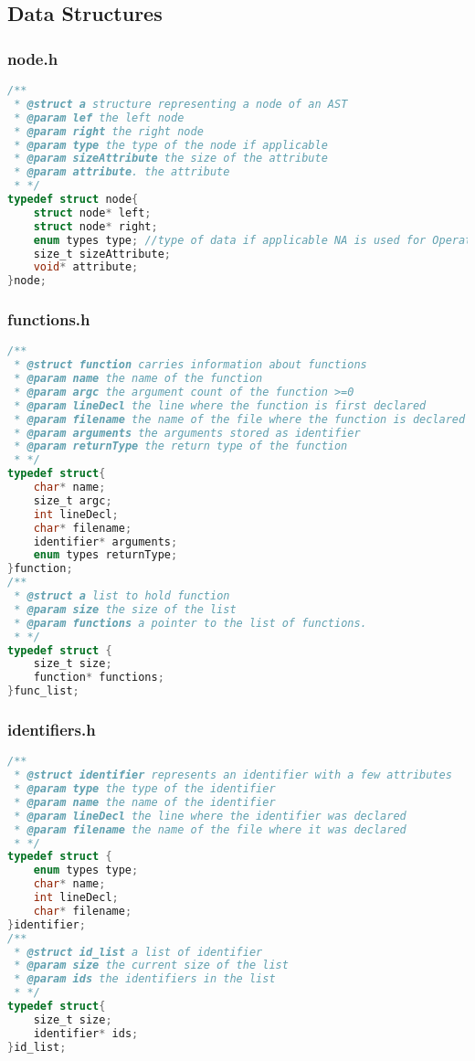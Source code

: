 \documentclass{article}
\begin{document}
\subsection{Data Structures}
\subsubsection{node.h}
\begin{lstlisting}[language=C]
/**
 * @struct a structure representing a node of an AST
 * @param lef the left node
 * @param right the right node
 * @param type the type of the node if applicable 
 * @param sizeAttribute the size of the attribute
 * @param attribute. the attribute
 * */
typedef struct node{
	struct node* left;
	struct node* right;
	enum types type; //type of data if applicable NA is used for Operators. 
	size_t sizeAttribute;
	void* attribute;
}node;


\end{lstlisting}
\subsubsection{functions.h}
\begin{lstlisting}[language=C]
/**
 * @struct function carries information about functions
 * @param name the name of the function
 * @param argc the argument count of the function >=0 
 * @param lineDecl the line where the function is first declared
 * @param filename the name of the file where the function is declared
 * @param arguments the arguments stored as identifier
 * @param returnType the return type of the function 
 * */
typedef struct{
	char* name;
	size_t argc;
	int lineDecl;
	char* filename;
	identifier* arguments;
	enum types returnType;
}function;
/**
 * @struct a list to hold function
 * @param size the size of the list
 * @param functions a pointer to the list of functions. 
 * */
typedef struct {
	size_t size;
	function* functions;
}func_list;


\end{lstlisting}

\subsubsection{identifiers.h}
\begin{lstlisting}[language=C]
/**
 * @struct identifier represents an identifier with a few attributes
 * @param type the type of the identifier
 * @param name the name of the identifier
 * @param lineDecl the line where the identifier was declared
 * @param filename the name of the file where it was declared
 * */
typedef struct {
	enum types type;
	char* name; 
	int lineDecl;
	char* filename;
}identifier;
/**
 * @struct id_list a list of identifier
 * @param size the current size of the list
 * @param ids the identifiers in the list
 * */
typedef struct{
	size_t size;
	identifier* ids;
}id_list;
\end{lstlisting}
\end{document}
